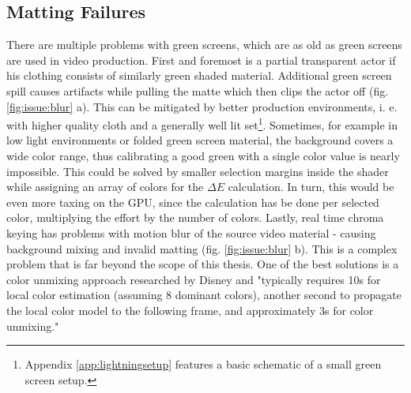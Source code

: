 \subsection{Matting Failures}

There are multiple problems with green screens, which are as old as green 
screens are used in video production. First and foremost is a partial 
transparent actor if his clothing consists of similarly green shaded material.
\newline
Additional green screen spill causes artifacts while pulling the matte which 
then clips the actor off (fig. \ref{fig:issue:blur} a). This can be mitigated 
by better production 
environments, i. e. with higher quality cloth and a generally well lit 
set\footnote{Appendix \ref{app:lightningsetup} features a basic schematic of a 
small green screen setup.}.
\newline
Sometimes, for example in low light environments or folded green screen 
material, the background covers a wide color range, thus calibrating a good 
green with a single color value is nearly impossible. This could be solved by 
smaller selection margins inside the shader while assigning an array of colors 
for the $\Delta E$ calculation. In turn, this would be even more taxing on the 
GPU, since the calculation has be done per selected color, multiplying the 
effort by the number of colors.
\newline
Lastly, real time chroma keying has problems with motion blur of the source 
video material - causing background mixing and invalid matting (fig. 
\ref{fig:issue:blur} b). This is a complex problem that is far beyond the scope 
of this thesis. One of the best solutions is a color unmixing approach 
researched by Disney and "typically requires 10s for local color estimation 
(assuming 8 dominant colors), another second to propagate the local color model 
to the following frame, and approximately 3s for color unmixing." 
\cite{disney:unmixing:2017}

